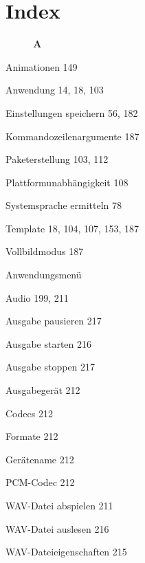 \documentclass{book}
\renewcommand\subitem{\par}
\begin{document}
\thispagestyle{plain}



\chapter*{Index}

\setlength{\multicolsep}{2cm}
\setlength{\columnsep}{5mm}

\begin{multicols}{2}

\fontsize{9}{11}\selectfont

\begin{osp-index}

  \setcounter{page}{219}
{\sffamily\bfseries ~~~~~A}\nopagebreak

  \item Animationen\hspace{1mm} 149
  \item Anwendung\hspace{1mm} 14, 18, 103
    \subitem Einstellungen speichern\hspace{1mm} 56, 182
    \subitem Kommandozeilenargumente\hspace{1mm} 187
    \subitem Paketerstellung\hspace{1mm} 103, 112
    \subitem Plattformunabh\"angigkeit\hspace{1mm} 108
    \subitem Systemsprache ermitteln\hspace{1mm} 78
    \subitem Template\hspace{1mm} 18, 104, 107, 153, 187
    \subitem Vollbildmodus\hspace{1mm} 187
  \item Anwendungsmen\"u\hspace{1mm} 
  \item Audio\hspace{1mm} 199, 211
    \subitem Ausgabe pausieren\hspace{1mm} 217
    \subitem Ausgabe starten\hspace{1mm} 216
    \subitem Ausgabe stoppen\hspace{1mm} 217
    \subitem Ausgabeger\"at\hspace{1mm} 212
    \subitem Codecs\hspace{1mm} 212
    \subitem Formate\hspace{1mm} 212
    \subitem Ger\"atename\hspace{1mm} 212
    \subitem PCM-Codec\hspace{1mm} 212
    \subitem WAV-Datei abspielen\hspace{1mm} 211
    \subitem WAV-Datei auslesen\hspace{1mm} 216
    \subitem WAV-Dateieigenschaften\hspace{1mm} 215


\end{osp-index}
\end{multicols}
\end{document}
